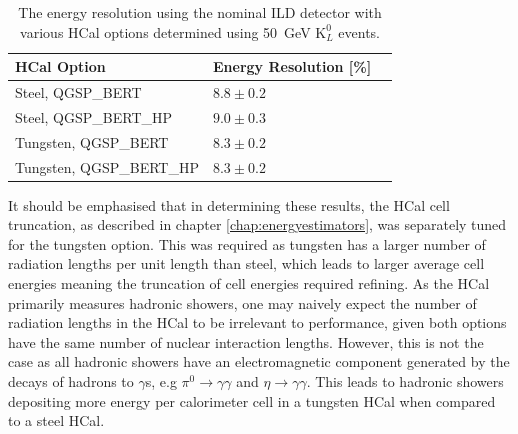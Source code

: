 \begin{table}[h!]
\centering
\begin{tabular}{ l l l }
\hline
HCal Option & Energy Resolution [\%] \\
\hline
Steel, QGSP\_BERT & $8.8\pm0.2$ \\
Steel, QGSP\_BERT\_HP & $9.0\pm0.3$ \\
Tungsten, QGSP\_BERT & $8.3\pm0.2$ \\
Tungsten, QGSP\_BERT\_HP & $8.3\pm0.2$ \\
\hline
\end{tabular}
\caption[The energy resolution using the nominal ILD detector with various HCal options determined using 50~GeV $\text{K}^{0}_{L}$ events.]{The energy resolution using the nominal ILD detector with various HCal options determined using 50~GeV $\text{K}^{0}_{L}$ events.}
\label{table:erhcalabsmaterial}
\end{table}

It should be emphasised that in determining these results, the HCal cell truncation, as described in chapter \ref{chap:energyestimators}, was separately tuned for the tungsten option.  This was required as tungsten has a larger number of radiation lengths per unit length than steel, which leads to larger average cell energies meaning the truncation of cell energies required refining.  As the HCal primarily measures hadronic showers, one may naively expect the number of radiation lengths in the HCal to be irrelevant to performance, given both options have the same number of nuclear interaction lengths.  However, this is not the case as all hadronic showers have an electromagnetic component generated by the decays of hadrons to $\gamma$s, e.g  $\pi^{0} \rightarrow \gamma \gamma$ and $\eta \rightarrow \gamma \gamma$.  This leads to hadronic showers depositing more energy per calorimeter cell in a tungsten HCal when compared to a steel HCal.

